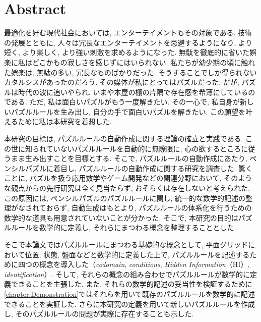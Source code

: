 \chapter*{{\rm \bf Abstract}}\label{chapter:Abstract}
最適化を好む現代社会においては, エンターテイメントもその対象である. 技術の発展とともに, 人々は冗長なエンターテイメントを忌避するようになり, より短く, より楽しく, より強い刺激を求めるようになった. 無駄を徹底的に省いた娯楽に私はどこかもの寂しさを感じずにはいられない. 私たちが幼少期の頃に触れた娯楽は, 無駄の多い, 冗長なものばかりだった. そうすることでしか得られないカタルシスがあったのだろう. その媒体が私にとってはパズルだった. だが, パズルは時代の波に追いやられ, いまや本屋の棚の片隅で存在感を希薄にしているのである. ただ, 私は面白いパズルがもう一度解きたい. その一心で, 私自身が新しいパズルルールを生み出し, 自分の手で面白いパズルを解きたい. この願望を叶えるために私は本研究を着想した.


本研究の目標は, パズルルールの自動作成に関する理論の確立と実践である. この世に知られていないパズルルールを自動的に無際限に, 心の欲するところに従うまま生み出すことを目標とする. そこで, パズルルールの自動作成にあたり, ペンシルパズルに着目し, パズルルールの自動作成に関する研究を調査した. 驚くことに, パズルを扱う応用数学やゲーム開発などの関連分野において, そのような観点からの先行研究は全く見当たらず, おそらくは存在しないと考えられた. この原因には, ペンシルパズルのパズルルールに関し, 統一的な数学的記述の整理がなされておらず, 自動生成はもとより, パズルルールの体系化を行うための数学的な道具も用意されていないことが分かった. そこで, 本研究の目的はパズルルールを数学的に定義し, それらにまつわる概念を整理することとした.

そこで本論文ではパズルルールにまつわる基礎的な概念として, 平面グリッドにおいて位置, 状態, 盤面などと数学的に定義した上で, パズルルールを記述するために四つの概念を導入した（\textit{codomain}, \textit{conditions}, \textit{Hidden Information}（HI）, \textit{identification}）. そして, それらの概念の組み合わせでパズルルールが数学的に定義できることを主張した. また, それらの数学的記述の妥当性を検証するために\cref{chapter:Demonstration}ではそれらを用いて既存のパズルルールを数学的に記述できることを実証した. さらに本研究の定義を用いて新しいパズルルールを作成し, そのパズルルールの問題が実際に存在することも示した.

